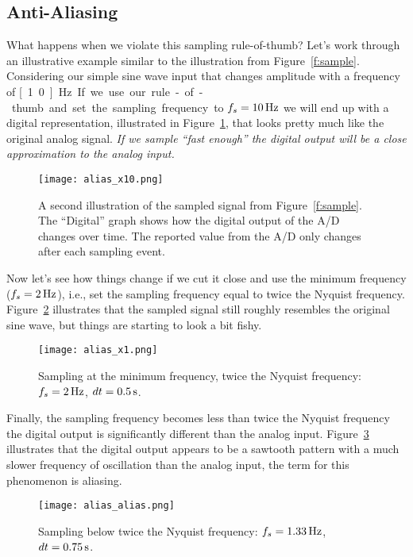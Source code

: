 \subsection{Anti-Aliasing}\label{s:alias}
What happens when we violate this sampling rule-of-thumb?  Let's work through an illustrative example similar to the illustration from Figure~\ref{f:sample}. Considering our simple sine wave input that changes amplitude with a frequency of \unit[1.0]{Hz}.  If we use our rule-of-thumb and set the sampling frequency to $f_s=\unit[10]{Hz}$ we will end up with a digital representation, illustrated in Figure~\ref{f:alias_x10}, that looks pretty much like the original analog signal.  \emph{If we sample ``fast enough'' the digital output will be a close approximation to the analog input.} 
\begin{figure}[hbt!]
\centering
\texttt{[image: alias\_x10.png]}
\caption{A second illustration of the sampled signal from Figure~\ref{f:sample}. The ``Digital'' graph shows how the digital output of the A/D changes over time.  The reported value from the A/D only changes after each sampling event.}
\label{f:alias_x10}
\end{figure}

Now let's see how things change if we cut it close and use the minimum frequency ($f_s=\unit[2]{Hz}$), i.e., set the sampling frequency equal to twice the Nyquist frequency. Figure~\ref{f:alias_x1} illustrates that the sampled signal still roughly resembles the original sine wave, but things are starting to look a bit fishy.   
\begin{figure}[hbt!]
\centering
\texttt{[image: alias\_x1.png]}
\caption{Sampling at the minimum frequency, twice the Nyquist frequency: $f_s=\unit[2]{Hz}$, $dt=\unit[0.5]{s}$.}
\label{f:alias_x1}
\end{figure}

Finally, the sampling frequency becomes less than twice the Nyquist frequency the digital output is significantly different than the analog input.  Figure~\ref{f:alias_alias} illustrates that the digital output appears to be a sawtooth pattern with a much slower frequency of oscillation than the analog input, the term for this phenomenon is \gls{aliasing}.
\begin{figure}[hbt!]
\centering
\texttt{[image: alias\_alias.png]}
\caption{Sampling below twice the Nyquist frequency: $f_s=\unit[1.33]{Hz}$, $dt=\unit[0.75]{s}$.}
\label{f:alias_alias}
\end{figure}

